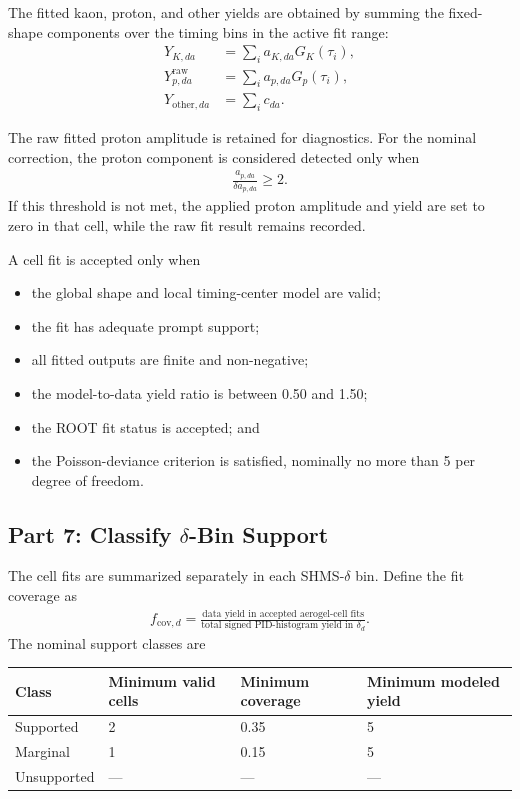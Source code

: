 \documentclass[11pt]{article}
\begin{document}
The fitted kaon, proton, and other yields are obtained by summing the fixed-shape
components over the timing bins in the active fit range:
\begin{align}
  Y_{K,da} &= \sum_i a_{K,da}G_K(\tau_i),\\
  Y_{p,da}^{\mathrm{raw}} &= \sum_i a_{p,da}G_p(\tau_i),\\
  Y_{\mathrm{other},da} &= \sum_i c_{da}.
\end{align}

The raw fitted proton amplitude is retained for diagnostics.  For the nominal
correction, the proton component is considered detected only when
\begin{align}
  \frac{a_{p,da}}{\delta a_{p,da}}\geq2.
\end{align}
If this threshold is not met, the applied proton amplitude and yield are set to
zero in that cell, while the raw fit result remains recorded.

A cell fit is accepted only when
\begin{itemize}[leftmargin=2em]
  \item the global shape and local timing-center model are valid;
  \item the fit has adequate prompt support;
  \item all fitted outputs are finite and non-negative;
  \item the model-to-data yield ratio is between 0.50 and 1.50;
  \item the ROOT fit status is accepted; and
  \item the Poisson-deviance criterion is satisfied, nominally no more than 5
        per degree of freedom.
\end{itemize}

\subsection{Part 7: Classify $\delta$-Bin Support}

The cell fits are summarized separately in each SHMS-$\delta$ bin.  Define the
fit coverage as
\begin{align}
  f_{\mathrm{cov},d}
  =\frac{\text{data yield in accepted aerogel-cell fits}}
         {\text{total signed PID-histogram yield in }\delta_d}.
\end{align}
The nominal support classes are
\begin{center}
\begin{tabular}{@{}llll@{}}
  \toprule
  Class & Minimum valid cells & Minimum coverage & Minimum modeled yield \\
  \midrule
  Supported & 2 & 0.35 & 5 \\
  Marginal  & 1 & 0.15 & 5 \\
  Unsupported & --- & --- & --- \\
  \bottomrule
\end{tabular}
\end{center}
\end{document}
